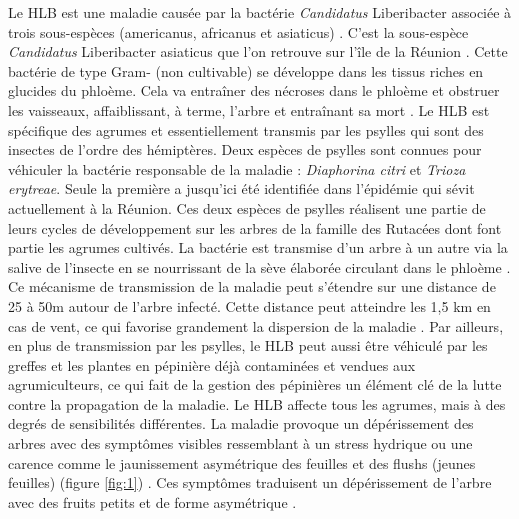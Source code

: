 \documentclass[
  11pt,
  french,
  a4paper,
  extrafontsizes,onecolumn,openright
  ]{memoir}
\begin{document}
Le HLB est une maladie causée par la bactérie \emph{Candidatus} Liberibacter associée à trois sous-espèces (americanus, africanus et asiaticus) \autocite{wang_citrus_2019}. C'est la sous-espèce \emph{Candidatus} Liberibacter asiaticus que l'on retrouve sur l'île de la Réunion \autocite{aubert_greening_1989}. Cette bactérie de type Gram- (non cultivable) se développe dans les tissus riches en glucides du phloème. Cela va entraîner des nécroses dans le phloème et obstruer les vaisseaux, affaiblissant, à terme, l'arbre et entraînant sa mort \autocite{bove_huanglongbing_2006}. Le HLB est spécifique des agrumes et essentiellement transmis par les psylles qui sont des insectes de l'ordre des hémiptères. Deux espèces de psylles sont connues pour véhiculer la bactérie responsable de la maladie : \emph{Diaphorina citri} et \emph{Trioza erytreae}. Seule la première a jusqu'ici été identifiée dans l'épidémie qui sévit actuellement à la Réunion. Ces deux espèces de psylles réalisent une partie de leurs cycles de développement sur les arbres de la famille des Rutacées dont font partie les agrumes cultivés. La bactérie est transmise d'un arbre à un autre via la salive de l'insecte en se nourrissant de la sève élaborée circulant dans le phloème \autocite{narouei-khandan_global_2016}. Ce mécanisme de transmission de la maladie peut s'étendre sur une distance de 25 à 50m autour de l'arbre infecté. Cette distance peut atteindre les 1,5 km en cas de vent, ce qui favorise grandement la dispersion de la maladie \autocite{bove_huanglongbing_2006}. Par ailleurs, en plus de transmission par les psylles, le HLB peut aussi être véhiculé par les greffes et les plantes en pépinière déjà contaminées et vendues aux agrumiculteurs, ce qui fait de la gestion des pépinières un élément clé de la lutte contre la propagation de la maladie.
Le HLB affecte tous les agrumes, mais à des degrés de sensibilités différentes. La maladie provoque un dépérissement des arbres avec des symptômes visibles ressemblant à un stress hydrique ou une carence comme le jaunissement asymétrique des feuilles et des flushs (jeunes feuilles) (figure \ref{fig:1}) \autocite{bove_huanglongbing_2006}. Ces symptômes traduisent un dépérissement de l'arbre avec des fruits petits et de forme asymétrique \autocite{gottwald_preliminary_1989}.



\scriptsize
\end{document}
